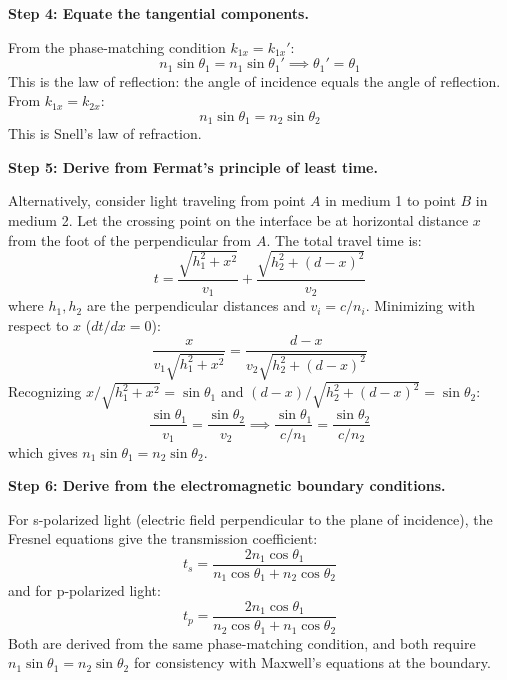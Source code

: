 \textbf{Step 4: Equate the tangential components.}

From the phase-matching condition $k_{1x} = k_{1x}'$:
\begin{equation}
n_1\sin\theta_1 = n_1\sin\theta_1' \implies \theta_1' = \theta_1
\end{equation}
This is the law of reflection: the angle of incidence equals the angle of reflection. From $k_{1x} = k_{2x}$:
\begin{equation}
n_1\sin\theta_1 = n_2\sin\theta_2
\end{equation}
This is Snell's law of refraction.

\textbf{Step 5: Derive from Fermat's principle of least time.}

Alternatively, consider light traveling from point $A$ in medium 1 to point $B$ in medium 2. Let the crossing point on the interface be at horizontal distance $x$ from the foot of the perpendicular from $A$. The total travel time is:
\begin{equation}
t = \frac{\sqrt{h_1^2 + x^2}}{v_1} + \frac{\sqrt{h_2^2 + (d-x)^2}}{v_2}
\end{equation}
where $h_1, h_2$ are the perpendicular distances and $v_i = c/n_i$. Minimizing with respect to $x$ ($dt/dx = 0$):
\begin{equation}
\frac{x}{v_1\sqrt{h_1^2+x^2}} = \frac{d-x}{v_2\sqrt{h_2^2+(d-x)^2}}
\end{equation}
Recognizing $x/\sqrt{h_1^2+x^2} = \sin\theta_1$ and $(d-x)/\sqrt{h_2^2+(d-x)^2} = \sin\theta_2$:
\begin{equation}
\frac{\sin\theta_1}{v_1} = \frac{\sin\theta_2}{v_2} \implies \frac{\sin\theta_1}{c/n_1} = \frac{\sin\theta_2}{c/n_2}
\end{equation}
which gives $n_1\sin\theta_1 = n_2\sin\theta_2$.

\textbf{Step 6: Derive from the electromagnetic boundary conditions.}

For s-polarized light (electric field perpendicular to the plane of incidence), the Fresnel equations give the transmission coefficient:
\begin{equation}
t_s = \frac{2n_1\cos\theta_1}{n_1\cos\theta_1 + n_2\cos\theta_2}
\end{equation}
and for p-polarized light:
\begin{equation}
t_p = \frac{2n_1\cos\theta_1}{n_2\cos\theta_1 + n_1\cos\theta_2}
\end{equation}
Both are derived from the same phase-matching condition, and both require $n_1\sin\theta_1 = n_2\sin\theta_2$ for consistency with Maxwell's equations at the boundary.


